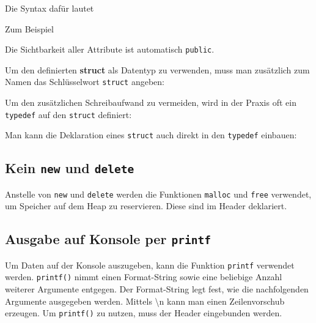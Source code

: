 Die Syntax dafür lautet



Zum Beispiel



Die Sichtbarkeit aller Attribute ist automatisch \lstinline{public}.

Um den definierten \textbf{struct} als Datentyp zu verwenden, muss man zusätzlich zum Namen das Schlüsselwort \lstinline{struct} angeben:



Um den zusätzlichen Schreibaufwand zu vermeiden, wird in der Praxis oft ein \lstinline{typedef} auf den \lstinline{struct} definiert:



Man kann die Deklaration eines \lstinline{struct} auch direkt in den \lstinline{typedef} einbauen:



\subsection{Kein \lstinline{new} und \lstinline{delete}}

Anstelle von \lstinline{new} und \lstinline{delete} werden die Funktionen \lstinline{malloc} und \lstinline{free} verwendet, um Speicher auf dem Heap zu reservieren.
Diese sind im Header  deklariert.



\subsection{Ausgabe auf Konsole per \lstinline{printf}}

Um Daten auf der Konsole auszugeben, kann die Funktion \lstinline{printf} verwendet werden.
\lstinline{printf()} nimmt einen Format-String sowie eine beliebige Anzahl weiterer Argumente entgegen.
Der Format-String legt fest, wie die nachfolgenden Argumente ausgegeben werden.
Mittels \textbackslash n kann man einen Zeilenvorschub erzeugen. Um \lstinline{printf()} zu nutzen, muss der Header  eingebunden werden.



